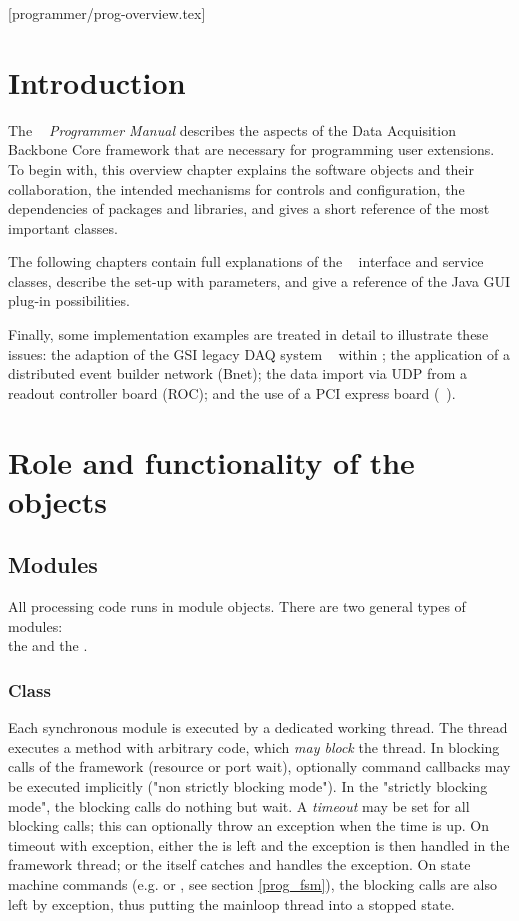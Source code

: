 [programmer/prog-overview.tex]
\section{Introduction}
The {\em \dabc~ Programmer Manual} 
describes the aspects of the Data Acquisition Backbone Core
framework that are necessary for programming user extensions.
To begin with, this overview chapter explains the
software objects and their collaboration, 
the intended mechanisms for controls and configuration, the dependencies of
packages and libraries, and gives a short reference of the most important classes.

The following chapters contain full explanations of the \dabc~ interface 
and service classes, 
describe the set-up with parameters, and give a reference of the Java GUI plug-in possibilities.

Finally, some implementation examples are treated in detail to illustrate these issues:
the adaption of the GSI legacy DAQ system \mbs~ within  \dabc; the application of a distributed
event builder network (Bnet); the data import via UDP from a readout controller board (ROC);
and the use of a PCI express board (\ABB~).

\section{Role and  functionality of the objects}

\subsection{Modules}
\label{prog_overview_modules}
All processing code runs in module objects. 
There are two general types of modules: \\
the  and the . 

\subsubsection{Class } 
Each synchronous module is executed by a 
dedicated working thread. The thread executes a
 method  with arbitrary code, which {\sl may block} 
the thread. In blocking calls of the framework (resource or 
port wait), optionally command callbacks may be executed 
implicitly ("non strictly blocking mode"). In the "strictly 
blocking mode", the blocking calls do nothing but wait. 
A {\sl timeout} may be set for all blocking calls; this can 
optionally throw an exception when the time is up. On timeout 
with exception, either the  is left and the exception 
is then handled in the framework thread; or the  itself 
catches and handles the exception. On state machine commands (e.g. 
 or , see section \ref{prog_fsm}), 
the blocking calls are also left by exception, 
thus putting the mainloop thread into a stopped state.

